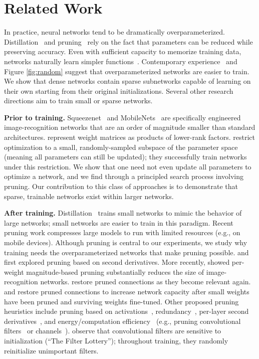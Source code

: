 \section{Related Work}

In practice, neural networks tend to be dramatically overparameterized.
Distillation~\citep{do-deep, distilling} and pruning~\citep{brain-damage, han-pruning}
rely on the fact that parameters can be reduced while preserving accuracy. Even with
sufficient capacity to memorize training data, networks naturally learn simpler functions~\citep{rethinking, in-search, closer}.
Contemporary experience~\citep{convex, distilling, rethinking} and Figure \ref{fig:random} suggest
that overparameterized networks are easier to train.
We show that
dense networks contain sparse subnetworks capable of learning on their own starting from their original
initializations.
Several other research directions aim to train small or sparse networks.

\textbf{Prior to training.} 
Squeezenet~\citep{squeezenet} and MobileNets~\citep{mobilenets}
are specifically engineered image-recognition networks that are an order of magnitude smaller
than standard architectures. 
\citet{denil} represent weight matrices as products of lower-rank factors. 
\citet{intrinsic} restrict optimization
to a small, randomly-sampled subspace of the parameter space (meaning all parameters can still be updated); they successfully train networks under this restriction.
We show that one need not even update
all parameters to optimize a network, and we find {} through a principled
search process involving pruning. 
Our contribution to this class of approaches is to demonstrate that sparse, trainable networks exist within larger networks.

\textbf{After training.} Distillation~\citep{do-deep, distilling} trains small networks to mimic the behavior of large networks; small networks are
easier to train in this paradigm.
Recent pruning work compresses large models to run with limited resources (e.g., on mobile devices).
Although pruning is central to our experiments, we study
why training needs the overparameterized networks that make pruning possible.
\citet{brain-damage} and \citet{brain-surgeon} first explored pruning based on second derivatives.
More recently, \citet{han-pruning} showed per-weight magnitude-based
pruning substantially reduces the size of image-recognition networks.
\citet{network-surgery} restore pruned connections as they become relevant again. \citet{dsd}
and \citet{skinny-deep} restore pruned connections to increase network capacity after small weights have been pruned and surviving weights fine-tuned.
Other proposed pruning heuristics include pruning based
on activations~\citep{prune-activation}, redundancy~\citep{diversity-nets, data-free-pruning}, per-layer second derivatives~\citep{obs2},
and energy/computation efficiency~\citep{prune-energy}
(e.g., pruning convolutional filters~\citep{pruning-filters, pruning-resource-efficient, thinet} or channels~\citep{channel-pruning}).
\citet{randomout} observe that convolutional filters are sensitive to initialization (``The Filter Lottery''); throughout training, they randomly reinitialize
unimportant filters.

